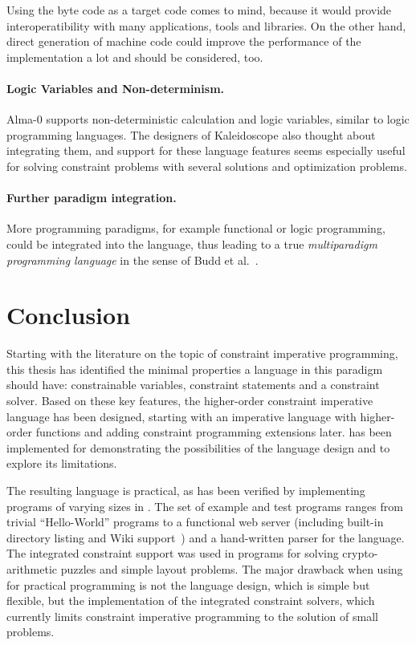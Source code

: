 Using the \java{} byte code as a target code comes to mind, because it
would provide interoperatibility with many applications, tools and
libraries.  On the other hand, direct generation of machine code could
improve the performance of the implementation a lot and should be
considered, too.

\paragraph{Logic Variables and Non-determinism.}
Alma-0 supports non-deterministic calculation and logic variables,
similar to logic programming languages.  The designers of Kaleidoscope
also thought about integrating them, and support for these language
features seems especially useful for solving constraint problems with
several solutions and optimization problems.

\paragraph{Further paradigm integration.}  
More programming paradigms, for example functional or logic
programming, could be integrated into the language, thus leading to a
true {\em multiparadigm programming language}
%
in the sense of Budd et al.~\cite{buddGeneral}.

\section{Conclusion}

Starting with the literature on the topic of constraint imperative
programming, this thesis has identified the minimal properties a
language in this paradigm should have: constrainable variables,
constraint statements and a constraint solver.  Based on these key
features, the higher-order constraint imperative language \turtle{}
has been designed, starting with an imperative language with
higher-order functions and adding constraint programming extensions
later.  \turtle{} has been implemented for demonstrating the
possibilities of the language design and to explore its limitations.

The resulting language is practical, as has been verified by
implementing programs of varying sizes in \turtle{}.  The set of
example and test programs ranges from trivial ``Hello-World'' programs
to a functional web server (including built-in directory listing and
Wiki support~\cite{cunningham01wiki}) and a
hand-written parser for the \turtle{} language.  The integrated
constraint support was used in programs for solving crypto-arithmetic
puzzles and simple layout problems.  The major drawback when using
\turtle{} for practical programming is not the language design, which
is simple but flexible, but the implementation of the integrated
constraint solvers, which currently limits constraint imperative
programming to the solution of small problems.

